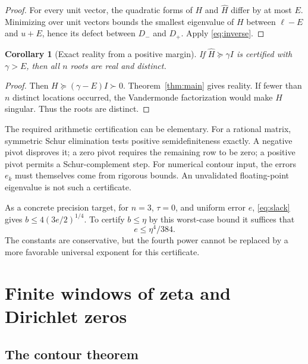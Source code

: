 \documentclass[11pt]{article}
\newtheorem{corollary}[theorem]{Corollary}
\theoremstyle{definition}
\begin{document}
\begin{proof}
For every unit vector, the quadratic forms of $H$ and $\widehat H$ differ
by at most $E$. Minimizing over unit vectors bounds the smallest eigenvalue
of $H$ between $\ell-E$ and $u+E$, hence its defect between $D_-$ and
$D_+$. Apply \eqref{eq:inverse}.
\end{proof}

\begin{corollary}[Exact reality from a positive margin]
\label{cor:exact}
If $\widehat H\succeq\gamma I$ is certified with $\gamma>E$, then all
$n$ roots are real and distinct.
\end{corollary}
\begin{proof}
Then $H\succeq(\gamma-E)I\succ0$. Theorem~\ref{thm:main} gives reality.
If fewer than $n$ distinct locations occurred, the Vandermonde
factorization would make $H$ singular. Thus the roots are distinct.
\end{proof}

The required arithmetic certification can be elementary. For a rational
matrix, symmetric Schur elimination tests positive semidefiniteness exactly.
A negative pivot disproves it; a zero pivot requires the remaining row to be
zero; a positive pivot permits a Schur-complement step. For numerical
contour input, the errors $e_k$ must themselves come from rigorous bounds.
An unvalidated floating-point eigenvalue is not such a certificate.

As a concrete precision target, for $n=3$, $\tau=0$, and uniform error $e$,
\eqref{eq:slack} gives $b\leq4(3e/2)^{1/4}$. To certify $b\leq\eta$ by
this worst-case bound it suffices that
\begin{equation}
 e\leq\eta^4/384.
 \label{eq:precision}
\end{equation}
The constants are conservative, but the fourth power cannot be replaced by
a more favorable universal exponent for this certificate.

\section{Finite windows of zeta and Dirichlet zeros}
\label{sec:contour}

\subsection{The contour theorem}
\end{document}
